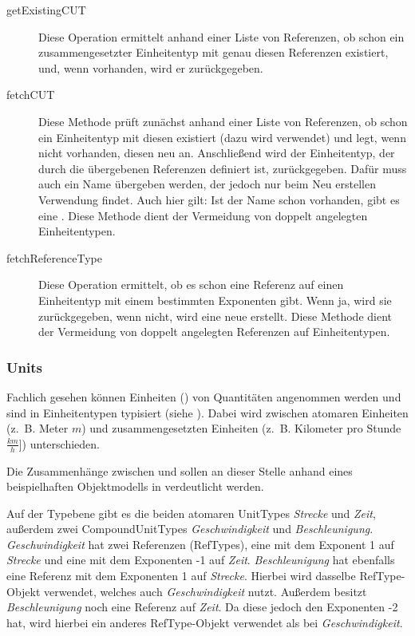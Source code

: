 \begin{description}
\item[getExistingCUT]
Diese Operation ermittelt anhand einer Liste von Referenzen, ob schon ein zusammengesetzter Einheitentyp mit genau diesen Referenzen existiert, und, wenn vorhanden, wird er zurückgegeben. 
\item[fetchCUT]
Diese Methode prüft zunächst anhand einer Liste von Referenzen, ob schon ein Einheitentyp mit diesen existiert (dazu wird  verwendet) und legt, wenn nicht vorhanden, diesen neu an. Anschließend wird der Einheitentyp, der durch die übergebenen Referenzen definiert ist, zurückgegeben. Dafür muss auch ein Name übergeben werden, der jedoch nur beim Neu erstellen Verwendung findet. Auch hier gilt: Ist der Name schon vorhanden, gibt es eine . Diese Methode dient der Vermeidung von doppelt angelegten Einheitentypen.
\item[fetchReferenceType]
Diese Operation ermittelt, ob es schon eine Referenz auf einen Einheitentyp mit einem bestimmten Exponenten gibt. Wenn ja, wird sie zurückgegeben, wenn nicht, wird eine neue erstellt. Diese Methode dient der Vermeidung von doppelt angelegten Referenzen auf Einheitentypen.
\end{description}


\subsubsection{Units}
Fachlich gesehen können Einheiten () von Quantitäten angenommen werden und sind in Einheitentypen typisiert (siehe ).
Dabei wird zwischen atomaren Einheiten (z.~B. Meter $m$) und zusammengesetzten Einheiten (z.~B. Kilometer pro Stunde $\frac{km}{h}$]) unterschieden.


Die Zusammenhänge zwischen  und  sollen an dieser Stelle anhand eines beispielhaften Objektmodells in  verdeutlicht werden.


Auf der Typebene gibt es die beiden atomaren UnitTypes \textit{Strecke} und \textit{Zeit}, außerdem zwei CompoundUnitTypes \textit{Geschwindigkeit} und \textit{Beschleunigung}. \textit{Geschwindigkeit} hat zwei Referenzen (RefTypes), eine mit dem Exponent 1 auf \textit{Strecke} und eine mit dem Exponenten -1 auf \textit{Zeit}. \textit{Beschleunigung} hat ebenfalls eine Referenz mit dem Exponenten 1 auf \textit{Strecke}. Hierbei wird dasselbe RefType-Objekt verwendet, welches auch \textit{Geschwindigkeit} nutzt. Außerdem besitzt \textit{Beschleunigung} noch eine Referenz auf \textit{Zeit}. Da diese jedoch den Exponenten -2 hat, wird hierbei ein anderes RefType-Objekt verwendet als bei \textit{Geschwindigkeit}.

